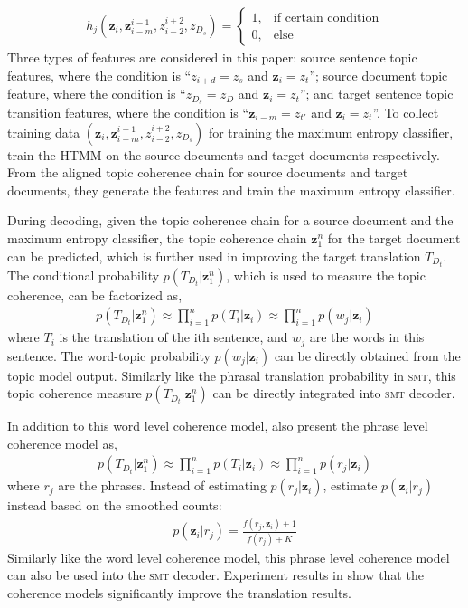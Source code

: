 \begin{align}
 h_j(\textbf{z}_i, \textbf{z}_{i-m}^{i-1}, z_{i-2}^{i+2}, z_{D_s}) = \begin{cases}
1, &\text{if certain condition} \\
0, &\text{else}
\end{cases}
\end{align}
Three types of features are considered in this paper: source sentence topic features, where the condition is ``$z_{i+d} = z_s$ and $\textbf{z}_i = z_t$''; source document topic feature, where the condition is ``$z_{D_s} = z_D$ and $\textbf{z}_i = z_t$'';  and target sentence topic transition features, where the condition is ``$\textbf{z}_{i-m} = z_{t'}$ and $\textbf{z}_i = z_t$''. To collect training data $(\textbf{z}_i, \textbf{z}_{i-m}^{i-1}, z_{i-2}^{i+2}, z_{D_s})$ for training the maximum entropy classifier, \citet{xiong-13} train the HTMM on the source documents and target documents respectively. From the aligned topic coherence chain for source documents and target documents, they generate the features and train the maximum entropy classifier.

During decoding, given the topic coherence chain for a source document and the maximum entropy classifier, the topic coherence chain $\textbf{z}_1^n$ for the target document can be predicted, which is further used in improving the target translation $T_{D_t}$. The conditional probability $p(T_{D_t} | \textbf{z}_1^n)$, which is used to measure the topic coherence, can be factorized as,
\begin{align}
p(T_{D_t} | \textbf{z}_1^n) \approx \prod_{i=1}^n p(T_i | \textbf{z}_i) \approx \prod_{i=1}^n p(w_j | \textbf{z}_i)
\end{align}
where $T_i$ is the translation of the ith sentence, and $w_j$ are the words in this sentence. The word-topic probability $p(w_j | \textbf{z}_i)$ can be directly obtained from the topic model output. Similarly like the phrasal translation probability in \textsc{smt}, this topic coherence measure $p(T_{D_t} | \textbf{z}_1^n)$ can be directly integrated into \textsc{smt} decoder.

In addition to this word level coherence model, \citet{xiong-13} also present the phrase level coherence model as,
\begin{align}
p(T_{D_t} | \textbf{z}_1^n) \approx \prod_{i=1}^n p(T_i | \textbf{z}_i) \approx \prod_{i=1}^n p(r_j | \textbf{z}_i)
\end{align}
where $r_j$ are the phrases. Instead of estimating $p(r_j | \textbf{z}_i)$, \citet{xiong-13} estimate $p(\textbf{z}_i | r_j)$ instead based on the smoothed counts:
\begin{align}
p(\textbf{z}_i | r_j) = \frac{f(r_j, \textbf{z}_i)+1}{f(r_j)+K}
\end{align}
Similarly like the word level coherence model, this phrase level coherence model can also be used into the \textsc{smt} decoder. Experiment results in \citet{xiong-13} show that the coherence models significantly improve the translation results.



